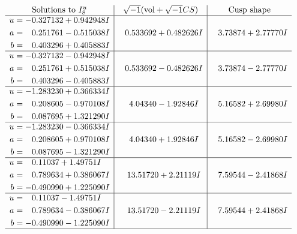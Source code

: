 \documentclass[1p]{elsarticle_modified}
\theoremstyle{definition}
\newcommand{\I}{\sqrt{-1}}
\begin{document}
$$\begin{array}{c|c|c}  
\text{Solutions to }I^u_{8}& \I (\text{vol} + \sqrt{-1}CS) & \text{Cusp shape}\\
 \hline 
\begin{aligned}
u &= -0.327132 + 0.942948 I \\
a &= \phantom{-}0.251761 - 0.515038 I \\
b &= \phantom{-}0.403296 + 0.405883 I\end{aligned}
 & \phantom{-}0.533692 + 0.482626 I & \phantom{-}3.73874 + 2.77770 I \\ \hline\begin{aligned}
u &= -0.327132 - 0.942948 I \\
a &= \phantom{-}0.251761 + 0.515038 I \\
b &= \phantom{-}0.403296 - 0.405883 I\end{aligned}
 & \phantom{-}0.533692 - 0.482626 I & \phantom{-}3.73874 - 2.77770 I \\ \hline\begin{aligned}
u &= -1.283230 + 0.366334 I \\
a &= \phantom{-}0.208605 - 0.970108 I \\
b &= \phantom{-}0.087695 + 1.321290 I\end{aligned}
 & \phantom{-}4.04340 - 1.92846 I & \phantom{-}5.16582 + 2.69980 I \\ \hline\begin{aligned}
u &= -1.283230 - 0.366334 I \\
a &= \phantom{-}0.208605 + 0.970108 I \\
b &= \phantom{-}0.087695 - 1.321290 I\end{aligned}
 & \phantom{-}4.04340 + 1.92846 I & \phantom{-}5.16582 - 2.69980 I \\ \hline\begin{aligned}
u &= \phantom{-}0.11037 + 1.49751 I \\
a &= \phantom{-}0.789634 + 0.386067 I \\
b &= -0.490990 + 1.225090 I\end{aligned}
 & \phantom{-}13.51720 + 2.21119 I & \phantom{-}7.59544 - 2.41868 I \\ \hline\begin{aligned}
u &= \phantom{-}0.11037 - 1.49751 I \\
a &= \phantom{-}0.789634 - 0.386067 I \\
b &= -0.490990 - 1.225090 I\end{aligned}
 & \phantom{-}13.51720 - 2.21119 I & \phantom{-}7.59544 + 2.41868 I\\
 \hline 
 \end{array}$$\newpage\newpage\renewcommand{\arraystretch}{1}
\end{document}
